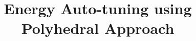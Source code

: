 \documentclass{sig-alternate}
\begin{document}
%

\title{Energy Auto-tuning using Polyhedral Approach}

%
%
%
%
%
\end{document}

